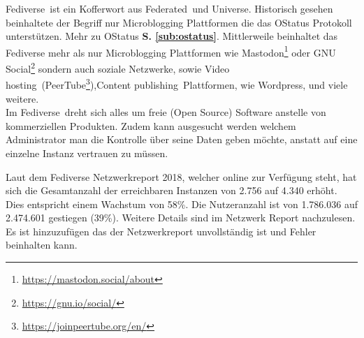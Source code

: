 {		\glqq Fediverse\grqq~ist ein Kofferwort aus \glqq Federated\grqq~und \glqq Universe\grqq. Historisch gesehen beinhaltete der Begriff nur Microblogging Plattformen die das OStatus Protokoll unterstützen. Mehr zu OStatus \textbf{S. \ref{sub:ostatus}}. Mittlerweile beinhaltet das Fediverse mehr als nur Microblogging Plattformen wie Mastodon\footnote{\url{https://mastodon.social/about}} oder GNU Social\footnote{\url{https://gnu.io/social/}} sondern auch soziale Netzwerke, sowie \glqq Video hosting\grqq~(PeerTube\footnote{\url{https://joinpeertube.org/en/}}),\glqq Content publishing\grqq~Plattformen, wie Wordpress, und viele weitere.\cite{fediverse}\\
		
		Im \glqq Fediverse\grqq~dreht sich alles um freie (Open Source) Software anstelle von kommerziellen Produkten. Zudem kann ausgesucht werden welchem Administrator man die Kontrolle über seine Daten geben möchte, anstatt auf eine einzelne Instanz vertrauen zu müssen.\cite{fediverse}\\
		
		Laut dem Fediverse Netzwerkreport 2018, welcher online zur Verfügung steht, hat sich die Gesamtanzahl der erreichbaren Instanzen von 2.756 auf 4.340 erhöht. Dies entspricht einem Wachstum von 58\%. Die Nutzeranzahl ist von 1.786.036 auf 2.474.601 gestiegen (39\%). Weitere Details sind im Netzwerk Report nachzulesen. Es ist hinzuzufügen das der Netzwerkreport unvollständig ist und Fehler beinhalten kann.\cite{fediverse-report}\\	
	}
